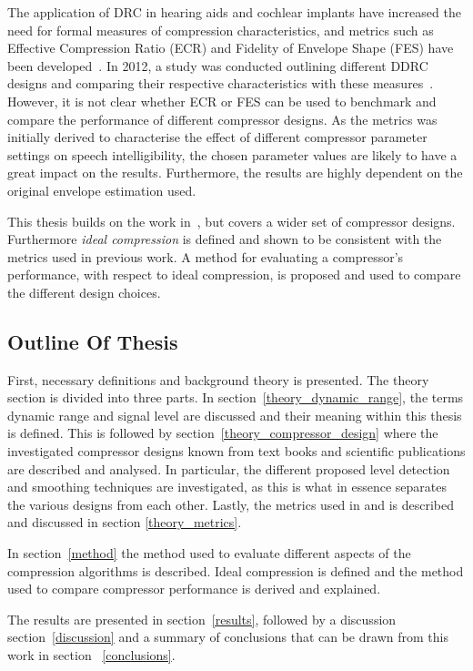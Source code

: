 \documentclass[../main2.tex]{subfiles}
\begin{document}
The application of DRC in hearing aids and cochlear implants have increased the need for formal measures of compression characteristics, and metrics such as Effective Compression Ratio (ECR) and Fidelity of Envelope Shape (FES) have been developed~\cite{stone1992syllabic}\cite{stone2007quantifying}. In 2012, a study was conducted outlining different DDRC designs and comparing their respective characteristics with these measures~\cite{reiss2012tutorial}. However, it is not clear whether ECR or FES can be used to benchmark and compare the performance of different compressor designs. As the metrics was initially derived to characterise the effect of different compressor parameter settings on speech intelligibility, the chosen parameter values are likely to have a great impact on the results. Furthermore, the results are highly dependent on the original envelope estimation used.

This thesis builds on the work in~\cite{reiss2012tutorial}, but covers a wider set of compressor designs. Furthermore \emph{ideal compression} is defined and shown to be consistent with the metrics used in previous work. A method for evaluating a compressor's performance, with respect to ideal compression, is proposed and used to compare the different design choices.
\subsection{Outline Of Thesis}
First, necessary definitions and background theory is presented. The theory section is divided into three parts. In section~\ref{theory_dynamic_range}, the terms dynamic range and signal level are discussed and their meaning within this thesis is defined. This is followed by section~\ref{theory_compressor_design} where the investigated compressor designs known from text books and scientific publications are described and analysed. In particular, the different proposed level detection and smoothing techniques are investigated, as this is what in essence separates the various designs from each other. Lastly, the metrics used in \cite{stone1992syllabic}\cite{stone2007quantifying} and \cite{reiss2012tutorial} is described and discussed in section \ref{theory_metrics}.

In section~\ref{method} the method used to evaluate different aspects of the compression algorithms is described. Ideal compression is defined and the method used to compare compressor performance is derived and explained.

The results are presented in section~\ref{results}, followed by a discussion section~\ref{discussion} and a summary of conclusions that can be drawn from this work in section ~\ref{conclusions}.
\end{document}
